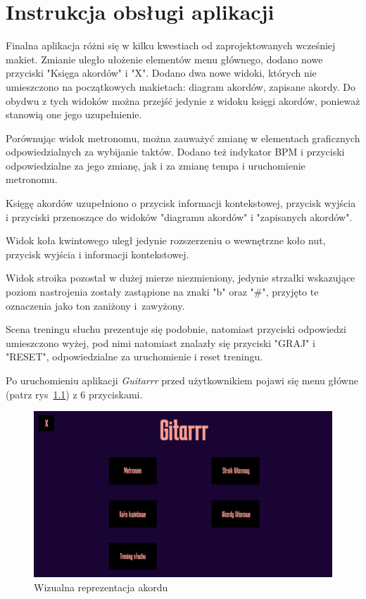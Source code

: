 \chapter{Instrukcja obsługi aplikacji}

Finalna aplikacja różni się w kilku kwestiach od zaprojektowanych wcześniej makiet. Zmianie uległo ułożenie elementów menu głównego, dodano nowe przyciski "Księga akordów" i "X". Dodano dwa nowe widoki, których nie umieszczono na początkowych makietach: diagram akordów, zapisane akordy. Do obydwu z tych widoków można przejść jedynie z widoku księgi akordów, ponieważ stanowią one jego uzupełnienie. 

Porównując widok metronomu, można zauważyć zmianę w elementach graficznych odpowiedzialnych za wybijanie taktów. Dodano też indykator BPM i przyciski odpowiedzialne za jego zmianę, jak i za zmianę tempa i uruchomienie metronomu.

Księgę akordów uzupełniono o przycisk informacji kontekstowej, przycisk wyjścia i przyciski przenoszące do widoków "diagramu akordów" i "zapisanych akordów".

Widok koła kwintowego uległ jedynie rozszerzeniu o wewnętrzne koło nut, przycisk wyjścia i informacji kontekstowej.

Widok stroika pozostał w dużej mierze niezmieniony, jedynie strzałki wskazujące poziom nastrojenia zostały zastąpione na znaki "b" oraz "\#", przyjęto te oznaczenia jako ton zaniżony i~zawyżony.

Scena treningu słuchu prezentuje się podobnie, natomiast przyciski odpowiedzi umieszczono wyżej, pod nimi natomiast znalazły się przyciski "GRAJ" i "RESET", odpowiedzialne za uruchomienie i reset treningu.

Po uruchomieniu aplikacji \emph{Guitarrr} przed użytkownikiem pojawi się menu główne (patrz rys~\ref{fig:Menu}) z 6 przyciskami.

\begin{figure}[htb]
	\centering
	\includegraphics[width=.50\linewidth]{rysB/MenuG}
	\caption{Wizualna reprezentacja akordu} \label{fig:Menu}
\end{figure}


